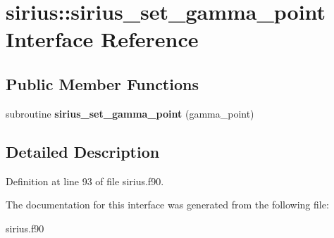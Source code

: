 \hypertarget{interfacesirius_1_1sirius__set__gamma__point}{}\section{sirius\+:\+:sirius\+\_\+set\+\_\+gamma\+\_\+point Interface Reference}
\label{interfacesirius_1_1sirius__set__gamma__point}
\subsection*{Public Member Functions}
\begin{DoxyCompactItemize}
\item 
\hypertarget{interfacesirius_1_1sirius__set__gamma__point_a8c4b3b2613720e0483bdf405fe365a44}{}subroutine {\bfseries sirius\+\_\+set\+\_\+gamma\+\_\+point} (gamma\+\_\+point)\label{interfacesirius_1_1sirius__set__gamma__point_a8c4b3b2613720e0483bdf405fe365a44}

\end{DoxyCompactItemize}


\subsection{Detailed Description}


Definition at line 93 of file sirius.\+f90.



The documentation for this interface was generated from the following file\+:\begin{DoxyCompactItemize}
\item 
sirius.\+f90\end{DoxyCompactItemize}
